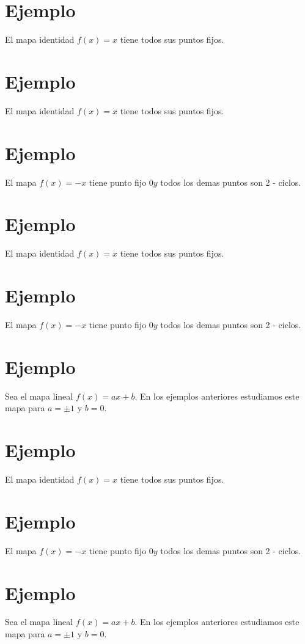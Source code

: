 \documentclass[11pt]{beamer}
\begin{document}
\section*{Ejemplo}
El mapa identidad $f(x)=x$ tiene todos sus puntos fijos.

\section*{Ejemplo}
El mapa identidad $f(x)=x$ tiene todos sus puntos fijos.

\section*{Ejemplo}
El mapa $f(x)=-x$ tiene punto fijo $0 y$ todos los demas puntos son 2 - ciclos.

\section*{Ejemplo}
El mapa identidad $f(x)=x$ tiene todos sus puntos fijos.

\section*{Ejemplo}
El mapa $f(x)=-x$ tiene punto fijo $0 y$ todos los demas puntos son 2 - ciclos.

\section*{Ejemplo}
Sea el mapa lineal $f(x)=a x+b$. En los ejemplos anteriores estudiamos este mapa para $a= \pm 1$ y $b=0$.

\section*{Ejemplo}
El mapa identidad $f(x)=x$ tiene todos sus puntos fijos.

\section*{Ejemplo}
El mapa $f(x)=-x$ tiene punto fijo $0 y$ todos los demas puntos son 2 - ciclos.

\section*{Ejemplo}
Sea el mapa lineal $f(x)=a x+b$. En los ejemplos anteriores estudiamos este mapa para $a= \pm 1$ y $b=0$.
\end{document}
